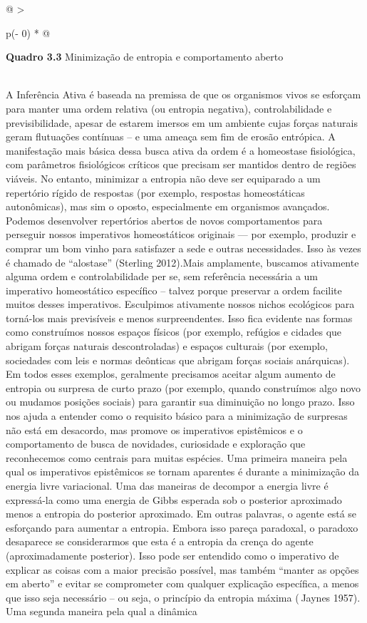 \documentclass[
  12pt,
]{book}
\begin{document}
\begin{longtable}[]{@{}
  >{\raggedright\arraybackslash}p{(\columnwidth - 0\tabcolsep) * }@{}}
\toprule
\begin{minipage}[b]{\linewidth}\raggedright
\textbf{Quadro 3.3} Minimização de entropia e comportamento aberto
\end{minipage} \\
\midrule
\endhead
A Inferência Ativa é baseada na premissa de que os organismos vivos se esforçam para manter uma ordem relativa (ou entropia negativa), controlabilidade e previsibilidade, apesar de estarem imersos em um ambiente cujas forças naturais geram flutuações contínuas -- e uma ameaça sem fim de erosão entrópica. A manifestação mais básica dessa busca ativa da ordem é a homeostase fisiológica, com parâmetros fisiológicos críticos que precisam ser mantidos dentro de regiões viáveis. No entanto, minimizar a entropia não deve ser equiparado a um repertório rígido de respostas (por exemplo, respostas homeostáticas autonômicas), mas sim o oposto, especialmente em organismos avançados. Podemos desenvolver repertórios abertos de novos comportamentos para perseguir nossos imperativos homeostáticos originais --- por exemplo, produzir e comprar um bom vinho para satisfazer a sede e outras necessidades. Isso às vezes é chamado de ``alostase'' (Sterling 2012).Mais amplamente, buscamos ativamente alguma ordem e controlabilidade per se, sem referência necessária a um imperativo homeostático específico -- talvez porque preservar a ordem facilite muitos desses imperativos. Esculpimos ativamente nossos nichos ecológicos para torná-los mais previsíveis e menos surpreendentes. Isso fica evidente nas formas como construímos nossos espaços físicos (por exemplo, refúgios e cidades que abrigam forças naturais descontroladas) e espaços culturais (por exemplo, sociedades com leis e normas deônticas que abrigam forças sociais anárquicas). Em todos esses exemplos, geralmente precisamos aceitar algum aumento de entropia ou surpresa de curto prazo (por exemplo, quando construímos algo novo ou mudamos posições sociais) para garantir sua diminuição no longo prazo. Isso nos ajuda a entender como o requisito básico para a minimização de surpresas não está em desacordo, mas promove os imperativos epistêmicos e o comportamento de busca de novidades, curiosidade e exploração que reconhecemos como centrais para muitas espécies. Uma primeira maneira pela qual os imperativos epistêmicos se tornam aparentes é durante a minimização da energia livre variacional. Uma das maneiras de decompor a energia livre é expressá-la como uma energia de Gibbs esperada sob o posterior aproximado menos a entropia do posterior aproximado. Em outras palavras, o agente está se esforçando para aumentar a entropia. Embora isso pareça paradoxal, o paradoxo desaparece se considerarmos que esta é a entropia da crença do agente (aproximadamente posterior). Isso pode ser entendido como o imperativo de explicar as coisas com a maior precisão possível, mas também ``manter as opções em aberto'' e evitar se comprometer com qualquer explicação específica, a menos que isso seja necessário -- ou seja, o princípio da entropia máxima ( Jaynes 1957). Uma segunda maneira pela qual a dinâmica 
\end{longtable}
\end{document}
